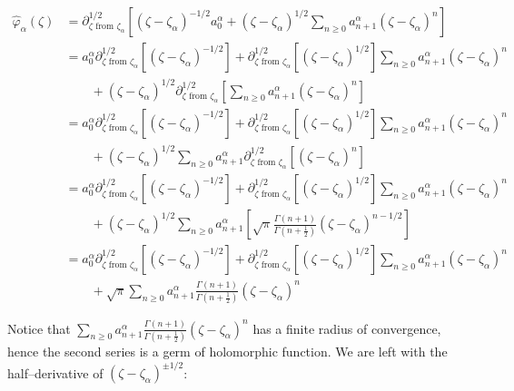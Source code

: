 \documentclass{article}
\begin{document}
\begin{align*}
\hat{\varphi}_{\alpha}(\zeta)&=\partial_{\zeta \text{ from } \zeta_\alpha}^{1/2}\left[(\zeta-\zeta_\alpha)^{-1/2}a_0^{\alpha}+(\zeta-\zeta_\alpha)^{1/2}\sum_{n\geq 0}a_{n+1}^{\alpha}(\zeta-\zeta_{\alpha})^{n}\right]\\
&=a_0^{\alpha}\partial_{\zeta \text{ from } \zeta_\alpha}^{1/2}\left[(\zeta-\zeta_\alpha)^{-1/2}\right]+\partial_{\zeta \text{ from } \zeta_\alpha}^{1/2}\left[(\zeta-\zeta_\alpha)^{1/2}\right]\sum_{n\geq 0}a_{n+1}^{\alpha}(\zeta-\zeta_{\alpha})^{n}\\
&\qquad+(\zeta-\zeta_\alpha)^{1/2}\partial_{\zeta \text{ from } \zeta_\alpha}^{1/2}\left[\sum_{n\geq 0}a_{n+1}^{\alpha}(\zeta-\zeta_{\alpha})^{n}\right]\\
&=a_0^{\alpha}\partial_{\zeta \text{ from } \zeta_\alpha}^{1/2}\left[(\zeta-\zeta_\alpha)^{-1/2}\right]+\partial_{\zeta \text{ from } \zeta_\alpha}^{1/2}\left[(\zeta-\zeta_\alpha)^{1/2}\right]\sum_{n\geq 0}a_{n+1}^{\alpha}(\zeta-\zeta_{\alpha})^{n}\\
&\qquad +(\zeta-\zeta_\alpha)^{1/2}\sum_{n\geq 0}a_{n+1}^{\alpha}\partial_{\zeta \text{ from } \zeta_\alpha}^{1/2}\left[(\zeta-\zeta_{\alpha})^{n}\right]\\
&=a_0^{\alpha}\partial_{\zeta \text{ from } \zeta_\alpha}^{1/2}\left[(\zeta-\zeta_\alpha)^{-1/2}\right]+\partial_{\zeta \text{ from } \zeta_\alpha}^{1/2}\left[(\zeta-\zeta_\alpha)^{1/2}\right]\sum_{n\geq 0}a_{n+1}^{\alpha}(\zeta-\zeta_{\alpha})^{n}\\
&\qquad +(\zeta-\zeta_\alpha)^{1/2}\sum_{n\geq 0}a_{n+1}^{\alpha}\left[\sqrt{\pi}\tfrac{\Gamma(n+1)}{\Gamma(n+\tfrac{1}{2})}(\zeta-\zeta_{\alpha})^{n-1/2}\right]\\
&=a_0^{\alpha}\partial_{\zeta \text{ from } \zeta_\alpha}^{1/2}\left[(\zeta-\zeta_\alpha)^{-1/2}\right]+\partial_{\zeta \text{ from } \zeta_\alpha}^{1/2}\left[(\zeta-\zeta_\alpha)^{1/2}\right]\sum_{n\geq 0}a_{n+1}^{\alpha}(\zeta-\zeta_{\alpha})^{n}\\
&\qquad +\sqrt{\pi}\sum_{n\geq 0}a_{n+1}^{\alpha}\tfrac{\Gamma(n+1)}{\Gamma(n+\tfrac{1}{2})}(\zeta-\zeta_{\alpha})^{n}
\end{align*}

Notice that $\sum_{n\geq 0}a_{n+1}^{\alpha}\tfrac{\Gamma(n+1)}{\Gamma(n+\tfrac{1}{2})}(\zeta-\zeta_{\alpha})^{n}$ has a finite radius of convergence, hence the second series is a germ of holomorphic function. We are left with the half--derivative of $(\zeta-\zeta_\alpha)^{\pm 1/2}$:
\end{document}
